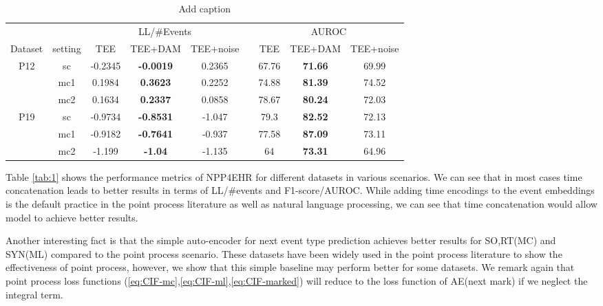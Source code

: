 \documentclass[journal,twoside,web]{ieeecolor}
\begin{document}
 
\begin{table}[htbp]
    \centering
    \caption{Add caption}
      \begin{tabular}{ccccccccc}
      \toprule
      \toprule
            &       & \multicolumn{3}{c}{LL/\#Events} &       & \multicolumn{3}{c}{AUROC} \\
  \cmidrule{3-5}\cmidrule{7-9}    Dataset & setting & TEE   & TEE+DAM & TEE+noise &       & TEE   & TEE+DAM & TEE+noise \\
      \midrule
      \multirow{3}[2]{*}{P12} & sc    & -0.2345 & \textbf{-0.0019} & 0.2365 &       & 67.76 & \textbf{71.66} & 69.99 \\
            & mc1   & 0.1984 & \textbf{0.3623} & 0.2252 &       & 74.88 & \textbf{81.39} & 74.52 \\
            & mc2   & 0.1634 & \textbf{0.2337} & 0.0858 &       & 78.67 & \textbf{80.24} & 72.03 \\
      \midrule
      \multirow{3}[2]{*}{P19} & sc    & -0.9734 & \textbf{-0.8531} & -1.047 &       & 79.3  & \textbf{82.52} & 72.13 \\
            & mc1   & -0.9182 & \textbf{-0.7641} & -0.937 &       & 77.58 & \textbf{87.09} & 73.11 \\
            & mc2   & -1.199 & \textbf{-1.04} & -1.135 &       & 64    & \textbf{73.31} & 64.96 \\
      \bottomrule
      \bottomrule
      \end{tabular}%
    \label{tab:2}%
  \end{table}%

Table \ref{tab:1} shows the performance metrics of NPP4EHR for different datasets in various scenarios. We can see that in most cases time concatenation leads to better results in terms of LL/\#events and F1-score/AUROC. While adding time encodings to the event embeddings is the default practice in the point process literature \cite*{zhangSelfAttentiveHawkesProcess2020,zuoTransformerHawkesProcess2020a} as well as natural language processing, we can see that time concatenation would allow model to achieve better results.

Another interesting fact is that the simple auto-encoder for next event type prediction achieves better results for SO,RT(MC) and SYN(ML) compared to the point process scenario. These datasets have been widely used in the point process literature to show the effectiveness of point process, however, we show that this simple baseline may perform better for some datasets. We remark again that point process loss functions (\ref*{eq:CIF-mc},\ref*{eq:CIF-ml},\ref*{eq:CIF-marked}) will reduce to the loss function of AE(next mark) if we neglect the integral term.
\end{document}
